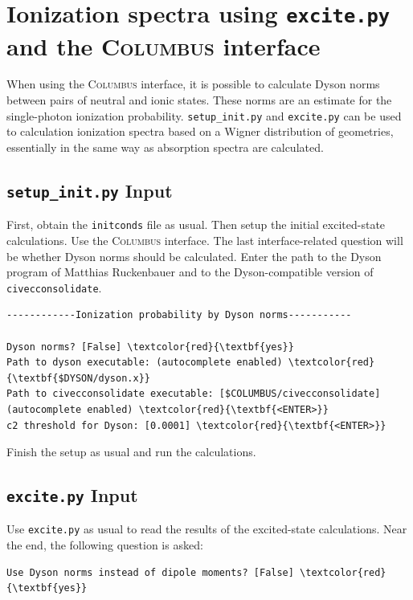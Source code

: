 \documentclass[a4paper,11pt,DIV=15,openany]{scrbook}
\newcommand{\ttt}[1]{\texttt{#1}}
\begin{document}
\section{Ionization spectra using \ttt{excite.py} and the \textsc{Columbus} interface}

When using the \textsc{Columbus} interface, it is possible to calculate Dyson norms between pairs of neutral and ionic states. These norms are an estimate for the single-photon ionization probability. \ttt{setup\_init.py} and \ttt{excite.py} can be used to calculation ionization spectra based on a Wigner distribution of geometries, essentially in the same way as absorption spectra are calculated.

\subsection{\ttt{setup\_init.py} Input}

First, obtain the \ttt{initconds} file as usual. Then setup the initial excited-state calculations. Use the \textsc{Columbus} interface. The last interface-related question will be whether Dyson norms should be calculated. Enter the path to the Dyson program of Matthias Ruckenbauer and to the Dyson-compatible version of \ttt{civecconsolidate}.
\begin{oframed}
\footnotesize\begin{Verbatim}[commandchars=\\\{\}]
------------Ionization probability by Dyson norms-----------

Dyson norms? [False] \textcolor{red}{\textbf{yes}}
Path to dyson executable: (autocomplete enabled) \textcolor{red}{\textbf{$DYSON/dyson.x}}
Path to civecconsolidate executable: [$COLUMBUS/civecconsolidate] (autocomplete enabled) \textcolor{red}{\textbf{<ENTER>}}
c2 threshold for Dyson: [0.0001] \textcolor{red}{\textbf{<ENTER>}}
\end{Verbatim}
\end{oframed}

\normalsize
Finish the setup as usual and run the calculations.

\subsection{\ttt{excite.py} Input}

Use \ttt{excite.py} as usual to read the results of the excited-state calculations. Near the end, the following question is asked:
\begin{oframed}
\footnotesize\begin{Verbatim}[commandchars=\\\{\}]
Use Dyson norms instead of dipole moments? [False] \textcolor{red}{\textbf{yes}}
\end{Verbatim}
\end{oframed}
\end{document}

